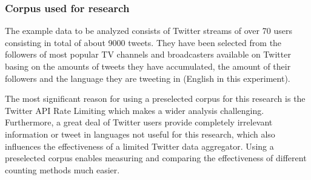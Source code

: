 \subsubsection{Corpus used for research}
The example data to be analyzed consists of Twitter streams of over 70 users
consisting in total of about 9000 tweets. They have been selected from the followers of most popular TV channels and broadcasters available on Twitter basing on the amounts of tweets they have accumulated, the amount of their followers and the language they are tweeting in (English in this experiment).

The most significant reason for using a preselected corpus for this research is
the Twitter API Rate Limiting which makes a wider analysis challenging.
Furthermore, a great deal of Twitter users provide completely irrelevant
information or tweet in languages not useful for this research, which also
influences the effectiveness of a limited Twitter data aggregator. Using a preselected corpus enables measuring and comparing the effectiveness of different counting methods much easier.
